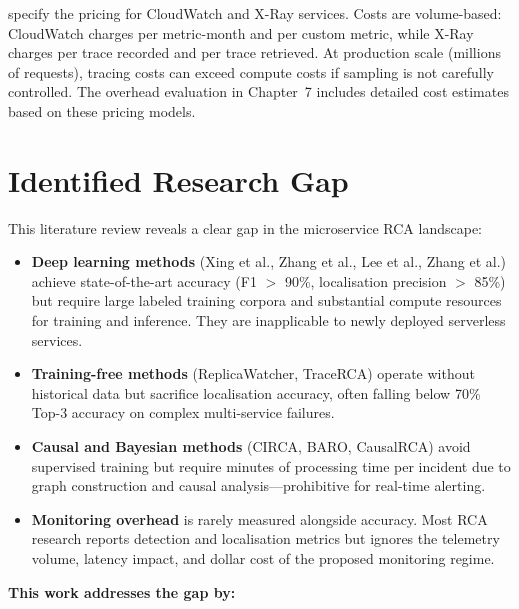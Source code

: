 \citet{awscloudwatchpricing, awsxraypricing} specify the pricing for CloudWatch and X-Ray services. Costs are volume-based: CloudWatch charges per metric-month and per custom metric, while X-Ray charges per trace recorded and per trace retrieved. At production scale (millions of requests), tracing costs can exceed compute costs if sampling is not carefully controlled. The overhead evaluation in Chapter~7 includes detailed cost estimates based on these pricing models.

\section{Identified Research Gap}

This literature review reveals a clear gap in the microservice RCA landscape:

\begin{itemize}
    \item \textbf{Deep learning methods} (Xing et al., Zhang et al., Lee et al., Zhang et al.) achieve state-of-the-art accuracy (F1 $>$ 90\%, localisation precision $>$ 85\%) but require large labeled training corpora and substantial compute resources for training and inference. They are inapplicable to newly deployed serverless services.
    
    \item \textbf{Training-free methods} (ReplicaWatcher, TraceRCA) operate without historical data but sacrifice localisation accuracy, often falling below 70\% Top-3 accuracy on complex multi-service failures.
    
    \item \textbf{Causal and Bayesian methods} (CIRCA, BARO, CausalRCA) avoid supervised training but require minutes of processing time per incident due to graph construction and causal analysis—prohibitive for real-time alerting.
    
    \item \textbf{Monitoring overhead} is rarely measured alongside accuracy. Most RCA research reports detection and localisation metrics but ignores the telemetry volume, latency impact, and dollar cost of the proposed monitoring regime.
\end{itemize}

\textbf{This work addresses the gap by:}

